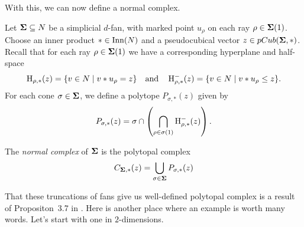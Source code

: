 \documentclass[12pt,oneside]{../../sfsuthesis}
\begin{document}
With this, we can now define a normal complex.
\begin{definition}\th\label{def:normalComplex}
    Let \( \bm{\Sigma} \subseteq N \) be a simplicial \( d \)-fan, with marked point \( u_\rho \) on each ray \( \rho \in \bm{\Sigma}(1) \).
    Choose an inner product \( \ast \in \operatorname{Inn}(N) \) and a pseudocubical vector \( z \in pCub(\bm{\Sigma}, \ast) \).
    Recall that for each ray \( \rho \in \bm{\Sigma}(1) \) we have a corresponding hyperplane and half-space
    \[
        \operatorname{H}_{\rho, \ast}(z) = \{ v \in N \; | \; v \ast u_\rho = z \}
        \quad \text{and} \quad
        \operatorname{H}^{-}_{\rho, \ast}(z) = \{ v \in N \; | \; v \ast u_\rho \leq z \}.
    \]
    For each cone \( \sigma \in \bm{\Sigma} \), we define a polytope \( P_{\sigma,\ast}(z) \) given by
    \[
        P_{\sigma,\ast}(z) = \sigma \cap \left( \bigcap_{\rho \in \sigma(1)} \operatorname{H}^{-}_{\rho, \ast}(z)\right).
    \]

    The \emph{normal complex} of \( \bm{\Sigma} \) is the polytopal complex
    \[
        C_{\bm{\Sigma}, \ast}(z) = \bigcup_{\sigma \in \bm{\Sigma}} P_{\sigma, \ast} (z)
    \]
\end{definition}
That these truncations of fans give us well-defined polytopal complex is a result of Propositon~3.7 in \cite{nathansonTropicalFansNormal2023}.
Here is another place where an example is worth many words.
Let's start with one in \( 2 \)-dimensions.
\end{document}
